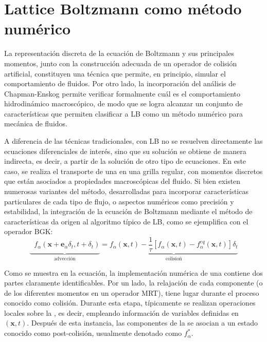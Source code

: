 \section{Lattice Boltzmann como m\'etodo num\'erico}

La representaci\'on discreta de la ecuaci\'on de Boltzmann y sus principales momentos, junto con la construcci\'on adecuada de un operador de colisi\'on artificial, constituyen una t\'ecnica que permite, en principio, simular el comportamiento de fluidos. Por otro lado, la incorporaci\'on del an\'alisis de Chapman-Enskog permite verificar formalmente cu\'al es el comportamiento hidrodin\'amico macrosc\'opico, de modo que se logra alcanzar un conjunto de caracter\'isticas que permiten clasificar a LB como un m\'etodo num\'erico para mec\'anica de fluidos.

A diferencia de las t\'ecnicas tradicionales, con LB no se resuelven directamente las ecuaciones diferenciales de inter\'es, sino que su soluci\'on se obtiene de manera indirecta, es decir, a partir de la soluci\'on de otro tipo de ecuaciones. En este caso, se realiza el transporte de una \fdp{} en una grilla regular, con momentos discretos que est\'an asociados a propiedades macrosc\'opicas del fluido. Si bien existen numerosas variantes del m\'etodo, desarrolladas para incorporar caracter\'isticas particulares de cada tipo de flujo, o aspectos num\'ericos como precisi\'on y estabilidad, la integraci\'on de la ecuaci\'on de Boltzmann mediante el m\'etodo de caracter\'isticas da origen al algoritmo t\'ipico de LB, como se ejemplifica con el operador BGK:
\begin{equation}
	\underbrace{ \phantom{\dfrac{1}{\tau}} f_{\alpha}(\bm{x}+\bm{e}_{\alpha}\delta_t, t+\delta_t)}_{\mbox{advecci\'on}} = 
	\underbrace{ f_{\alpha}(\bm{x},t) -\dfrac{1}{\tau} \left[ f_{\alpha}(\bm{x},t) - f_{\alpha}^{eq}(\bm{x},t) \right]\delta_t}_{\mbox{colisio\'n}}
\end{equation}

Como se muestra en la ecuaci\'on, la implementaci\'on num\'erica de una \lbe{} contiene dos partes claramente identificables. Por un lado, la relajaci\'on de cada componente (o de los diferentes momentos en un operador MRT), tiene lugar durante el proceso conocido como colisi\'on. Durante esta etapa, t\'ipicamente se realizan operaciones locales sobre la \fdp{}, es decir, empleando informaci\'on de variables definidas en $(\bm{x},t)$. Despu\'es de esta instancia, las componentes de la \fdp{} se asocian a un estado conocido como post-colisi\'on, usualmente denotado como $f_{\alpha}^*$. 

